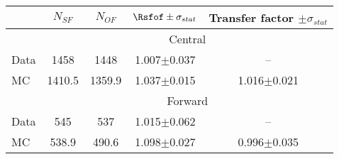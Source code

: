
\begin{table}[hbtp]
 \renewcommand{\arraystretch}{1.3}
 \setlength{\belowcaptionskip}{6pt}
 \centering
 \caption{
     }
  \label{tab:rSFOF}
\begin{tabular}{l|c|c|c|c}     
 & $N_{SF}$ & $N_{OF}$ & $ \Rsfof \pm \sigma_{stat}$ & Transfer factor $\pm \sigma_{stat}$  \\    
\hline
 & \multicolumn{4}{c}{Central} \\
\hline
 Data & 1458 & 1448 & 1.007$\pm$0.037 & -- \\
 MC & 1410.5 & 1359.9 & 1.037$\pm$0.015 & 1.016$\pm$0.021\\
 
 
    \hline 
& \multicolumn{4}{c}{Forward} \\
\hline
 Data & 545 & 537 & 1.015$\pm$0.062 & -- \\
 MC & 538.9 & 490.6 & 1.098$\pm$0.027 & 0.996$\pm$0.035\\


  
\end{tabular}  
\end{table}

